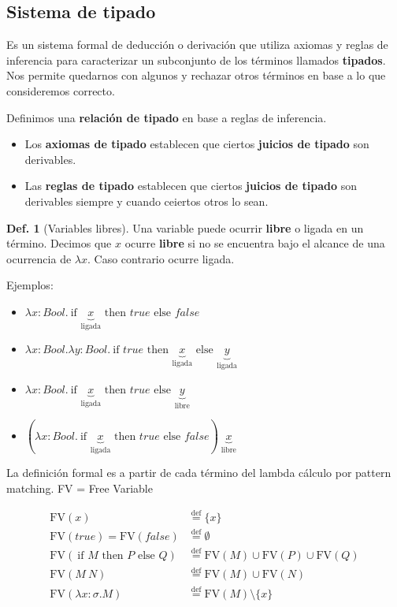 \documentclass{report}
\theoremstyle{definition} %
\newtheorem{definition}{Def.}[chapter]
\newcommand{\eqdef}{\overset{\text{def}}{=}}
\newcommand{\ifte}[3]{\ \text{if } #1 \text{ then } #2 \text{ else } #3}
\newcommand{\abs}[3]{\lambda #1 : #2 . #3}
\newcommand{\app}[2]{#1 \ #2} %
\newcommand{\fv}[1]{\text{FV}(#1)} %
\newcommand{\ligada}[1]{\underbrace{#1}_{\text{ligada}}}
\newcommand{\libre}[1]{\underbrace{#1}_{\text{libre}}}
\begin{document}
\subsection{Sistema de tipado}

Es un sistema formal de deducción o derivación que utiliza axiomas y reglas de
inferencia para caracterizar un subconjunto de los términos llamados
\textbf{tipados}. Nos permite quedarnos con algunos y rechazar otros términos en
base a lo que consideremos correcto.

Definimos una \textbf{relación de tipado} en base a reglas de inferencia.
\begin{itemize}
    \item Los \textbf{axiomas de tipado} establecen que ciertos \textbf{juicios
    de tipado} son derivables.
    \item Las \textbf{reglas de tipado} establecen que ciertos \textbf{juicios
    de tipado} son derivables siempre y cuando ceiertos otros lo sean.  
\end{itemize}

\begin{definition}[Variables libres]
Una variable puede ocurrir \textbf{libre} o ligada en un término. Decimos que
$x$ ocurre \textbf{libre} si no se encuentra bajo el alcance de una ocurrencia
de $\lambda x$. Caso contrario ocurre ligada.

Ejemplos:

\begin{itemize}
    \item $\abs
        {x}{Bool}
        {\ifte{\ligada{x}}{true}{false}}$
    \item $\abs
        {x}
        {Bool}
        {\abs{y}{Bool}{\ifte{true}{\ligada{x}}{\ligada{y}}}}$
    \item $\abs{x}{Bool}{\ifte{\ligada{x}}{true}{\libre{y}}}$
    \item $\app{(\abs{x}{Bool}{\ifte{\ligada{x}}{true}{false}})}{\libre{x}}$
\end{itemize}

La definición formal es a partir de cada término del lambda cálculo por pattern
matching. FV = Free Variable

\begin{align*}
    \fv{x} &\eqdef \{ x \} \\
    \fv{true} = \fv{false} &\eqdef \emptyset \\
    \fv{\ifte{M}{P}{Q}} &\eqdef \fv{M} \cup \fv{P} \cup \fv{Q} \\
    \fv{\app{M}{N}} &\eqdef \fv{M} \cup \fv{N} \\
    \fv{\abs{x}{\sigma}{M}} &\eqdef \fv{M} \setminus \{ x \}
\end{align*}
\end{definition}
\end{document}
